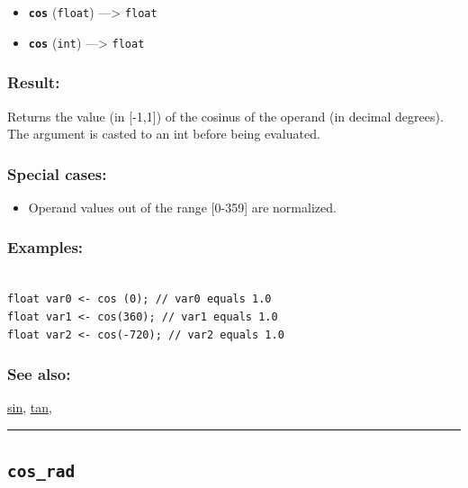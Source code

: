 \documentclass[]{book}
\providecommand{\tightlist}{%
  \setlength{\itemsep}{0pt}\setlength{\parskip}{0pt}}
\theoremstyle{definition}
\theoremstyle{definition}
\theoremstyle{definition}
\theoremstyle{remark}
\begin{document}
\begin{itemize}
\tightlist
\item
  \textbf{\texttt{cos}} (\texttt{float}) ---\textgreater{}
  \texttt{float}
\item
  \textbf{\texttt{cos}} (\texttt{int}) ---\textgreater{} \texttt{float}
\end{itemize}

\subsubsection{Result:}\label{result-107}

Returns the value (in {[}-1,1{]}) of the cosinus of the operand (in
decimal degrees). The argument is casted to an int before being
evaluated.

\subsubsection{Special cases:}\label{special-cases-39}

\begin{itemize}
\tightlist
\item
  Operand values out of the range {[}0-359{]} are normalized.
\end{itemize}

\subsubsection{Examples:}\label{examples-84}

\begin{verbatim}
 
float var0 <- cos (0); // var0 equals 1.0 
float var1 <- cos(360); // var1 equals 1.0 
float var2 <- cos(-720); // var2 equals 1.0
\end{verbatim}

\subsubsection{See also:}\label{see-also-67}

\href{operators-s-to-z.html\#sin}{sin},
\href{operators-s-to-z.html\#tan}{tan},

\begin{center}\rule{0.5\linewidth}{\linethickness}\end{center}

\subsection{\texorpdfstring{\texttt{cos\_rad}}{cos\_rad}}\label{cos_rad}
\end{document}
